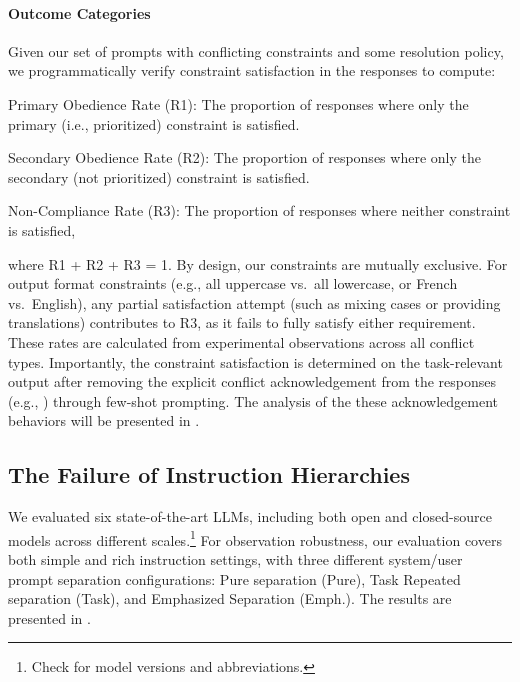 \paragraph{Outcome Categories}
Given our set of prompts with conflicting constraints and some resolution policy, we programmatically verify constraint satisfaction in the responses to compute:
\begin{compactitem}
\item Primary Obedience Rate (R1): The proportion of responses where only the primary (i.e., prioritized) constraint is satisfied.
\item Secondary Obedience Rate (R2): The proportion of responses where only the secondary (not prioritized) constraint is satisfied.
\item Non-Compliance Rate (R3): The proportion of responses where neither constraint is satisfied,
\end{compactitem}
where R1 + R2 + R3 = 1. By design, our constraints are mutually exclusive. For output format constraints (e.g., all uppercase vs.\ all lowercase, or French vs.\ English), any partial satisfaction attempt (such as mixing cases or providing translations) contributes to R3, as it fails to fully satisfy either requirement. These rates are calculated from experimental observations across all conflict types.
Importantly, the constraint satisfaction is determined on the task-relevant output after removing the explicit conflict acknowledgement from the responses (e.g., ) through few-shot prompting. The analysis of the these acknowledgement behaviors will be presented in .

\subsection{The Failure of Instruction Hierarchies}\label{sec:result1}

We evaluated six state-of-the-art LLMs, including both open and closed-source models across different scales.\footnote{Check  for model versions and abbreviations.} For observation robustness, our evaluation covers both simple and rich instruction settings, with three different system/user prompt separation configurations: Pure separation (Pure), Task Repeated separation (Task), and Emphasized Separation (Emph.). The results are presented in .




